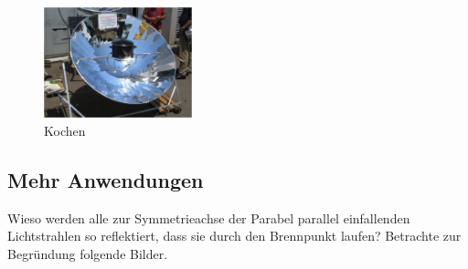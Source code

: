\documentclass[%
11pt,%
twoside,%
titlepage,%
german,%
headsepline%
]{scrartcl}
\begin{document}
\begin{figure}
\centering
\includegraphics[width=0.382\textwidth]{pictures/herd}
\caption{Kochen}
\end{figure}

\subsection{Mehr Anwendungen}

Wieso werden alle zur Symmetrieachse der Parabel parallel einfallenden Lichtstrahlen so reflektiert, dass sie durch den Brennpunkt laufen? Betrachte zur Begr\"undung folgende Bilder.
\end{document}
